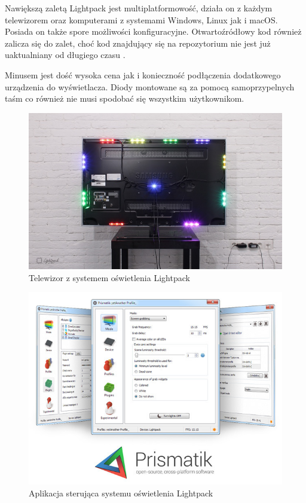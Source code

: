 \documentclass[12pt]{report}
\begin{document}
Nawiększą zaletą Lightpack jest multiplatformowość, działa on z każdym telewizorem oraz komputerami z systemami Windows, Linux jak i macOS. Posiada on także spore możliwości konfiguracyjne. Otwartoźródłowy kod również zalicza się do zalet, choć kod znajdujący się na repozytorium nie jest już uaktualniany od długiego czasu \cite{legacy}.

Minusem jest dość wysoka cena jak i konieczność podłączenia dodatkowego urządzenia do wyświetlacza. Diody montowane są za pomocą samoprzypelnych taśm co również nie musi spodobać się wszystkim użytkownikom.

\begin{figure}[h]
\centering
\includegraphics[width=\textwidth]{../resources/lightpackm.jpg}
\caption[Telewizor z systemem oświetlenia Lightpack]{Telewizor z systemem oświetlenia Lightpack \cite{lps}}
\end{figure}

\begin{figure}[h]
\centering
\includegraphics[width=.8\textwidth]{../resources/prismatik.jpg}
\caption[Aplikacja sterująca systemu oświetlenia Lightpack]{Aplikacja sterująca systemu oświetlenia Lightpack \cite{lps}}
\end{figure}
\end{document}
